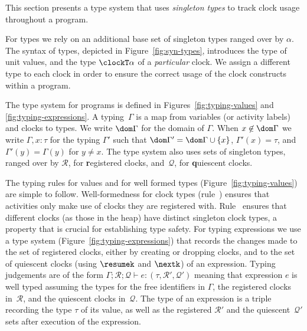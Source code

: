 This section presents a type system that uses \emph{singleton types}
to track clock usage throughout a program.



For types we rely on an additional base set of singleton types ranged
over by $\alpha$.
The syntax of types, depicted in Figure~\ref{fig:syn-types},
introduces the type \unitT{} of unit values, and the type $\clockT
\alpha$ of a \emph{particular} clock. We assign a different type to
each clock in order to ensure the correct usage of the clock
constructs within a program.

The type system for \xtenclocks{} programs is defined in
Figures~\ref{fig:typing-values} and \ref{fig:typing-expressions}.
A typing~$\Gamma$ is a map from variables (or activity labels) and
clocks to types.
We write $\dom \Gamma$ for the domain of $\Gamma$. When $x \not \in
\dom \Gamma$ we write $\Gamma, x \colon \tau$ for the typing $\Gamma'$
such that $\dom \Gamma' = \dom \Gamma \cup \{x\}$, $\Gamma'(x) =
\tau$, and $\Gamma'(y) = \Gamma(y)$ for $y \neq x$.
The type system also uses sets of singleton types, ranged over by
$\mathcal R$, for \textbf registered clocks, and~$\mathcal Q$, for
\textbf quiescent clocks.



The typing rules for values and for well formed types
(Figure~\ref{fig:typing-values}) are simple to follow. Well-formed\-ness
for clock types (rule~\Twfc) ensures that activities only make use of
clocks they are registered with.
Rule~\TclockSeq{} ensures that different clocks (as those in the heap)
have distinct singleton clock types, a property that is crucial for
establishing type safety.
For typing expressions we use a type system
(Figure~\ref{fig:typing-expressions}) that records the changes made to
the set of registered clocks, either by creating or dropping clocks,
and to the set of quiescent clocks (using $\resumek$ and $\nextk$) of
an expression.
Typing judgements are of the form $\Gamma; \mathcal R; \mathcal Q
\vdash e \colon (\tau, \mathcal R', \mathcal Q')$ meaning that
expression $e$ is well typed assuming the types for the free
identifiers in $\Gamma$, the registered clocks in~$\mathcal R$, and
the quiescent clocks in~$\mathcal Q$.
The type of an expression is a triple recording the type $\tau$ of its
value, as well as the registered $\mathcal R'$ and the
quiescent~$\mathcal {Q'}$ sets after execution of the expression.

